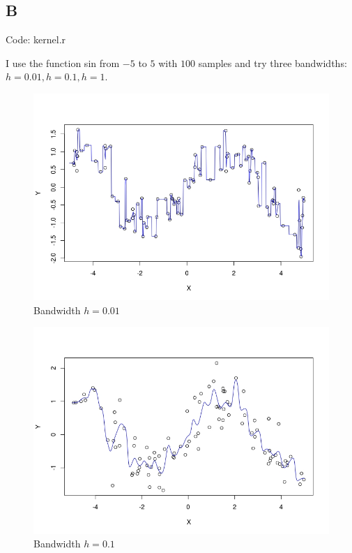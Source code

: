 \documentclass{article}
\begin{document}
\subsection*{B}
Code: kernel.r

\noindent
I use the function \textsf{sin} from $-5$ to $5$ with $100$ samples and try three bandwidths: \(h = 0.01, h = 0.1, h = 1\).

\begin{figure}[h!]
\includegraphics[width = \textwidth]{h001.jpeg}
\caption{Bandwidth \(h = 0.01\)}
\end{figure}

\begin{figure}[h!]
\includegraphics[width = \textwidth]{h01.jpeg}
\caption{Bandwidth \(h = 0.1\)}
\end{figure}
\end{document}
